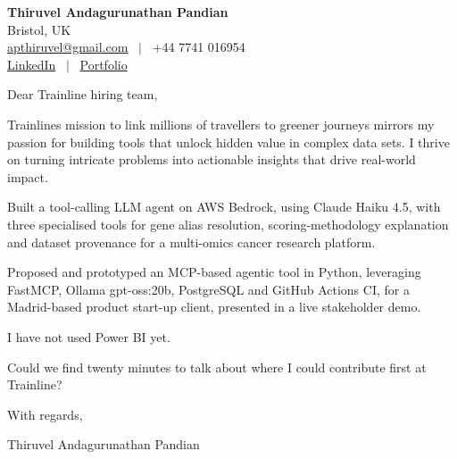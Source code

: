 \documentclass[11pt,a4paper]{article}
\begin{document}
\raggedright
\pagestyle{empty}

\begin{center}
    {\LARGE \color{linkblue} \textbf{Thiruvel Andagurunathan Pandian}}\\[0.2cm]
    Bristol, UK \\
    \href{mailto:apthiruvel@gmail.com}{apthiruvel@gmail.com} \ $|$ \ +44 7741 016954 \\
\href{https://www.linkedin.com/in/thiruvel-a-p/}{LinkedIn} \ $|$ \ \href{https://thiruvel-ap.github.io/PersonalPortfolio/}{Portfolio}
\end{center}

\vspace{0.4cm}

\noindent
Dear Trainline hiring team,

Trainline\textquotesingle{}s mission to link millions of travellers to greener journeys mirrors my passion for building tools that unlock hidden value in complex data sets. I thrive on turning intricate problems into actionable insights that drive real-world impact.

Built a tool-calling LLM agent on AWS Bedrock, using Claude Haiku 4.5, with three specialised tools for gene alias resolution, scoring-methodology explanation and dataset provenance for a multi-omics cancer research platform.

Proposed and prototyped an MCP-based agentic tool in Python, leveraging FastMCP, Ollama gpt-oss:20b, PostgreSQL and GitHub Actions CI, for a Madrid-based product start-up client, presented in a live stakeholder demo.

I have not used Power BI yet.

Could we find twenty minutes to talk about where I could contribute first at Trainline?

\vspace{0.5cm}

With regards,

Thiruvel Andagurunathan Pandian
\end{document}
